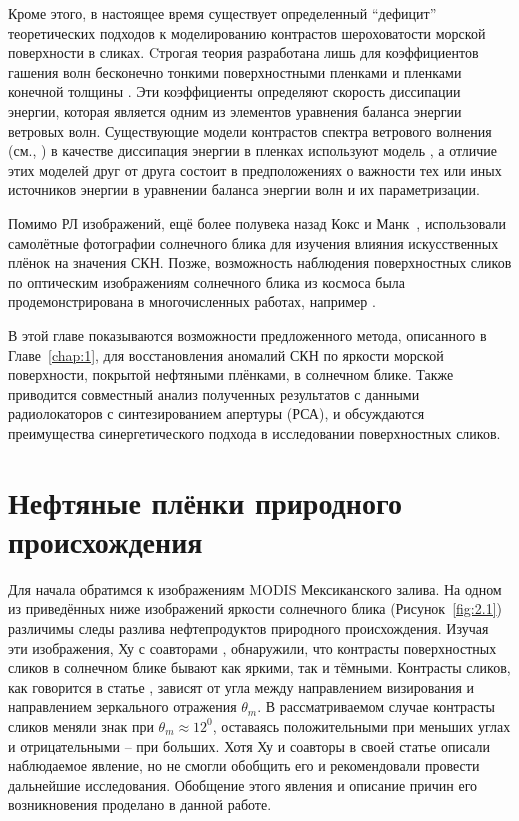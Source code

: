 Кроме этого, в настоящее время существует определенный ``дефицит'' теоретических подходов к моделированию контрастов шероховатости морской поверхности в сликах. Cтрогая теория разработана лишь для коэффициентов гашения волн бесконечно тонкими поверхностными пленками \citep{Levich1959} и пленками конечной толщины \citep{Jenkins1997}. Эти коэффициенты определяют скорость диссипации энергии, которая является одним из элементов уравнения баланса энергии ветровых волн. Существующие модели контрастов спектра ветрового волнения (см., \citep{Ermakov1987, Ermakov1992, Alpers1989, Gade1998}) в качестве диссипация энергии в пленках используют модель \citep{Levich1959}, а отличие этих моделей друг от друга состоит в предположениях о важности тех или иных источников энергии в уравнении баланса энергии волн и их параметризации.

Помимо РЛ изображений, ещё более полувека назад Кокс и Манк~\citep{Cox1954, Cox1954a}, использовали самолётные фотографии солнечного блика для изучения влияния искусственных плёнок на значения СКН. Позже, возможность наблюдения поверхностных сликов по оптическим изображениям солнечного блика из космоса была продемонстрирована в многочисленных работах, например \citep{Brekke2005, Chust2007, Hu2009}.

В этой главе показываются возможности предложенного метода, описанного в Главе~\ref{chap:1}, для восстановления аномалий СКН по яркости морской поверхности, покрытой нефтяными плёнками, в солнечном блике. Также приводится совместный анализ полученных результатов с данными радиолокаторов с синтезированием апертуры (РСА), и обсуждаются преимущества синергетического подхода в исследовании поверхностных сликов.



\section{Нефтяные плёнки природного происхождения} \label{sec:2.1}


Для начала обратимся к изображениям MODIS Мексиканского залива. На одном из приведённых ниже изображений яркости солнечного блика (Рисунок~\ref{fig:2.1}) различимы следы разлива нефтепродуктов природного происхождения. Изучая эти изображения, Ху с соавторами \citep{Hu2009}, обнаружили, что контрасты поверхностных сликов в солнечном блике бывают как яркими, так и тёмными. Контрасты сликов, как говорится в статье \citep{Hu2009}, зависят от угла между направлением визирования и направлением зеркального отражения $\theta _{m} $. В рассматриваемом случае контрасты сликов меняли знак при $\theta _{m} \approx 12^{0} $, оставаясь положительными при меньших углах и отрицательными -- при больших. Хотя Ху и соавторы в своей статье \citep{Hu2009} описали наблюдаемое явление, но не смогли обобщить его и рекомендовали провести дальнейшие исследования. Обобщение этого явления и описание причин его возникновения проделано в данной работе.


